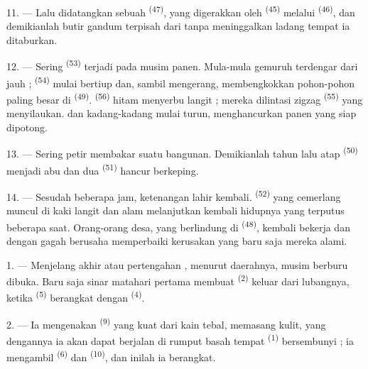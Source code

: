 11. --- Lalu didatangkan sebuah 
\textsuperscript{(47)}, yang digerakkan oleh  \textsuperscript{(45)} melalui 
\textsuperscript{(46)}, dan demikianlah butir gandum terpisah dari
 tanpa meninggalkan ladang tempat ia ditaburkan.

\VUsaut{5.0mm}
\VUsaut{3.4mm}

12. --- Sering  \textsuperscript{(53)} terjadi pada
musim panen. Mula-mula gemuruh  terdengar dari jauh ;
 \textsuperscript{(54)} mulai bertiup
dan, sambil mengerang, membengkokkan pohon-pohon paling besar di
 \textsuperscript{(49)}. 
\textsuperscript{(56)} hitam menyerbu langit ; mereka dilintasi
zigzag  \textsuperscript{(55)} yang menyilaukan.
 dan kadang-kadang  mulai turun,
menghancurkan panen yang siap dipotong.

13. --- Sering petir membakar suatu bangunan. Demikianlah tahun lalu
atap  \textsuperscript{(50)} menjadi abu dan dua
 \textsuperscript{(51)} hancur berkeping.

14. --- Sesudah beberapa jam, ketenangan lahir kembali.
 \textsuperscript{(52)} yang cemerlang muncul di kaki
langit dan alam melanjutkan kembali hidupnya yang terputus beberapa
saat. Orang-orang desa, yang berlindung di 
\textsuperscript{(48)}, kembali bekerja dan dengan gagah berusaha
memperbaiki kerusakan yang baru saja mereka alami.

\VUsaut{6.0mm}
\VUsaut{3.6mm}

\VUsaut{1.4mm}
\VUsaut{4.0mm}

1. --- Menjelang akhir  atau pertengahan
, menurut daerahnya, musim berburu dibuka. Baru saja
sinar matahari pertama membuat 
\textsuperscript{(2)} keluar dari lubangnya, ketika 
\textsuperscript{(5)} berangkat dengan 
\textsuperscript{(4)}.

2. --- Ia mengenakan  \textsuperscript{(9)}
yang kuat dari kain tebal, memasang  kulit,
yang dengannya ia akan dapat berjalan di rumput basah tempat
 \textsuperscript{(1)} bersembunyi ; ia mengambil
 \textsuperscript{(6)} dan 
\textsuperscript{(10)}, dan inilah ia berangkat.

